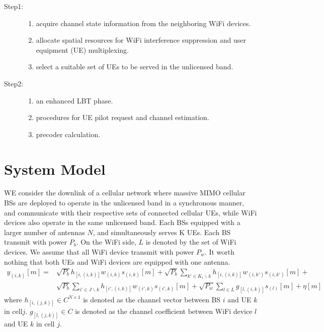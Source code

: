 \documentclass[12pt, onecolumn]{IEEEtran}
\begin{document}
\begin{description}
  \item[Step1:] %
                    \begin{enumerate}
                      \item acquire channel state information from the neighboring WiFi devices.
                      \item allocate spatial resources for WiFi interference suppression and user equipment (UE) multiplexing.
                      \item select a suitable set of UEs to be served in the unlicensed band.
                    \end{enumerate}
  \item[Step2:] %
                    \begin{enumerate}
                        \item an enhanced LBT phase.
                        \item procedures for UE pilot request and channel estimation.
                        \item precoder calculation.
                    \end{enumerate}
\end{description}


\section{System Model}

  WE consider the downlink of a cellular network where  massive MIMO cellular BSs are deployed to operate in the unlicensed band in a synchronous manner, and communicate with their respective sets of connected cellular UEs, while WiFi devices also operate in the same unlicensed band.  Each BSs equipped with  a larger number of antennas $N$, and  simultaneously serves K UEs. Each BS transmit with power $P_{b}$. On the WiFi side, $L$ is denoted by the set of WiFi devices. We assume that all WiFi device transmit with power $P_{w}$.  It worth nothing that both UEs and WiFi devices are equipped with one antenna.
 \begin{equation}\label{EQU:ChannelModel}
    \begin{aligned}
        y_{(i,k)}[m] = & \sqrt{P_{b}}h_{[i,(i,k)]}w_{(i,k)}s_{(i,k)}[m] + \sqrt{P_{b}}\sum_{k'\in{}K_{i}\backslash{}k}h_{[i,(i,k)]}w_{(i,k')}s_{(i,k')}[m] +  \\ & \sqrt{P_{b}}\sum_{i'\in{}J\backslash{}k}h_{[i',(i,k)]}w_{(i',k)}s_{(i',k)}[m] +    \sqrt{P_{w}}\sum_{l\in{}L}g_{[l,(i,k)]}s_{(l)}[m]  +  \eta[m]
    \end{aligned}
\end{equation}
where $h_{[i,(j,k)]} \in{}C^{N\times{}1}$ is denoted as the channel vector between BS $i$ and UE $k$ in cell$j$.  $g_{[l,(j,k)]} \in{}C$ is denoted as the channel coefficient  between WiFi device $l$ and UE $k$ in cell $j$.
\end{document}
